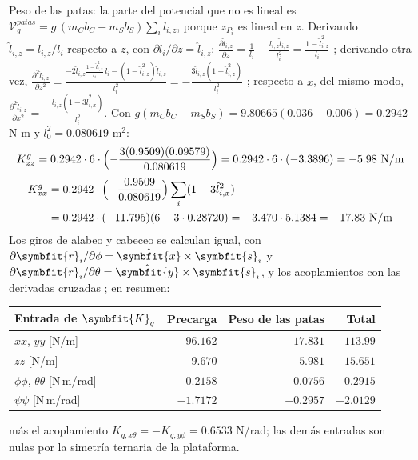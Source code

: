\documentclass[11pt,a4paper]{article}
\makeatletter
\numberwithin{equation}{section}
\renewcommand\paragraph{\@startsection{paragraph}{4}{\z@}{1.4ex plus .4ex}{-0.6em}%
  {\normalfont\color{tinta}}}
\newcommand{\vect}[1]{\symbfit{#1}}
\makeatother
\begin{document}
\paragraph{Peso de las patas:} la parte del potencial que no es lineal es $\mathcal V_g^{patas} = g\,(m_Cb_C - m_Sb_S)\sum_i\hat l_{i,z}$, porque $z_{P_i}$ es lineal en $z$. Derivando $\hat l_{i,z} = l_{i,z}/l_i$ respecto a $z$, con $\partial l_i/\partial z = \hat l_{i,z}$: $\frac{\partial\hat l_{i,z}}{\partial z} = \frac{1}{l_i} - \frac{l_{i,z}\hat l_{i,z}}{l_i^2} = \frac{1 - \hat l_{i,z}^2}{l_i}$ ; derivando otra vez, $\frac{\partial^2\hat l_{i,z}}{\partial z^2} = \frac{-2\hat l_{i,z}\frac{1 - \hat l_{i,z}^2}{l_i}\,l_i - (1 - \hat l_{i,z}^2)\hat l_{i,z}}{l_i^2} = -\frac{3\hat l_{i,z}(1 - \hat l_{i,z}^2)}{l_i^2}$ ; respecto a $x$, del mismo modo, $\frac{\partial^2\hat l_{i,z}}{\partial x^2} = -\frac{\hat l_{i,z}(1 - 3\hat l_{i,x}^2)}{l_i^2}$. Con $g(m_Cb_C - m_Sb_S) = 9.80665(0.036 - 0.006) = 0.2942$ N m y $l_0^2 = 0.080619$ m$^2$:
\[
K^{g}_{zz} = 0.2942\cdot6\cdot\Bigl(-\frac{3(0.9509)(0.09579)}{0.080619}\Bigr) = 0.2942\cdot6\cdot(-3.3896) = -5.98\ \text{N/m}
\]
\[
\begin{aligned}K^{g}_{xx} &= 0.2942\cdot\Bigl(-\frac{0.9509}{0.080619}\Bigr)\sum_i(1 - 3\hat l_{i,x}^2)\\ &= 0.2942\cdot(-11.795)(6 - 3\cdot0.28720) = -3.470\cdot5.1384 = -17.83\ \text{N/m}\end{aligned}
\]
Los giros de alabeo y cabeceo se calculan igual, con $\partial\vect r_i/\partial\phi = \hat{\vect x}\times\vect s_i$ y $\partial\vect r_i/\partial\theta = \hat{\vect y}\times\vect s_i$, y los acoplamientos con las derivadas cruzadas ; en resumen:
\begin{center}
\begin{tabular}{|l|r|r|r|}
\hline
Entrada de $\vect K_q$ & Precarga & Peso de las patas & Total \\ \hline
$xx$, $yy$ [N/m] & $-96.162$ & $-17.831$ & $-113.99$ \\ \hline
$zz$ [N/m] & $-9.670$ & $-5.981$ & $-15.651$ \\ \hline
$\phi\phi$, $\theta\theta$ [N\,m/rad] & $-0.2158$ & $-0.0756$ & $-0.2915$ \\ \hline
$\psi\psi$ [N\,m/rad] & $-1.7172$ & $-0.2957$ & $-2.0129$ \\ \hline
\end{tabular}
\end{center}
más el acoplamiento $K_{q,x\theta} = -K_{q,y\phi} = 0.6533$ N/rad; las demás entradas son nulas por la simetría ternaria de la plataforma.
\end{document}
